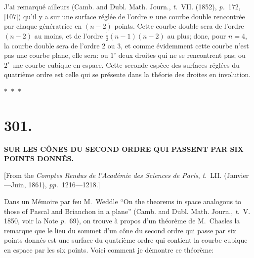 \documentclass[11pt,a4paper]{article}
\newcommand{\tome}{\textit{t.}}
\newcommand{\page}{\textit{p.}}
\newcommand{\pages}{\textit{pp.}}
\newcommand{\asterism}{\par\begin{center}$\ast$~$\ast$~$\ast$\end{center}\par}
\begin{document}
J'ai remarqu\'{e} ailleurs (Camb. and Dubl. Math. Journ., \tome~VII. (1852), \page~172, [107]) qu'il y a sur une surface r\'{e}gl\'{e}e de l'ordre $n$ une courbe double rencontr\'{e}e par chaque g\'{e}n\'{e}ratrice en $(n-2)$ points. Cette courbe double sera de l'ordre $(n-2)$ au moins, et de l'ordre $\frac{1}{2}(n-1)(n-2)$ au plus; donc, pour $n = 4$, la courbe double sera de l'ordre 2 ou 3, et comme \'{e}videmment cette courbe n'est pas une courbe plane, elle sera: ou $1^\circ$ deux droites qui ne se rencontrent pas; ou $2^\circ$ une courbe cubique en espace. Cette seconde esp\`{e}ce des surfaces r\'{e}gl\'{e}es du quatri\`{e}me ordre est celle qui se pr\'{e}sente dans la th\'{e}orie des droites en involution.

\asterism

\clearpage

\section*{301.}

\begin{center}
\textbf{SUR LES C\^{O}NES DU SECOND ORDRE QUI PASSENT PAR SIX\\POINTS DONN\'{E}S.}
\end{center}

[From the \textit{Comptes Rendus de l'Acad\'{e}mie des Sciences de Paris}, \tome~LII. (Janvier---Juin, 1861), \pages~1216---1218.]

\medskip

Dans un M\'{e}moire par feu M.~Weddle ``On the theorems in space analogous to those of Pascal and Brianchon in a plane'' (Camb. and Dubl. Math. Journ., \tome~V. 1850, voir la Note \page~69), on trouve \`{a} propos d'un th\'{e}or\`{e}me de M.~Chasles la remarque que le lieu du sommet d'un c\^{o}ne du second ordre qui passe par six points donn\'{e}s est une surface du quatri\`{e}me ordre qui contient la courbe cubique en espace par les six points. Voici comment je d\'{e}montre ce th\'{e}or\`{e}me:
\end{document}
